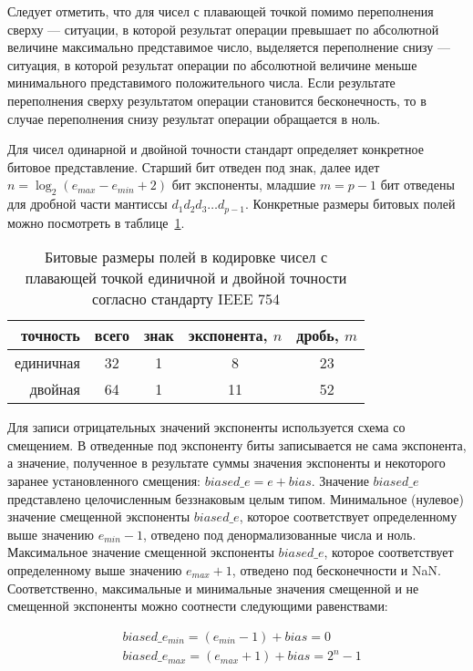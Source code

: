 Следует отметить, что для чисел с плавающей точкой помимо переполнения сверху --- ситуации, в которой результат операции превышает по абсолютной величине максимально представимое число, выделяется переполнение снизу --- ситуация, в которой результат операции по абсолютной величине меньше минимального представимого положительного числа.
Если результате переполнения сверху результатом операции становится бесконечность, то в случае переполнения снизу результат операции обращается в ноль.

Для чисел одинарной и двойной точности стандарт определяет конкретное битовое представление.
Старший бит отведен под знак, далее идет $n = \log_2(e_{max} - e_{min} + 2)$ бит экспоненты, младшие $m = p-1$ бит отведены для дробной части мантиссы $d_{1}d_{2}d_{3}\ldots d_{p-1}$.
Конкретные размеры битовых полей можно посмотреть в таблице~\ref{tab:ieee_bit_size_common}.

\begin{table}[h]
    \centering
    \begin{tabular}{r||c|c|c|c}
        точность  & всего & знак & экспонента, $n$ & дробь, $m$ \\
        \hline\hline
        единичная & 32    & 1    & 8               & 23    \\
        \hline
        двойная   & 64    & 1    & 11              & 52    \\
    \end{tabular}
    \caption{Битовые размеры полей в кодировке чисел с плавающей точкой единичной и двойной точности согласно стандарту IEEE 754}
    \label{tab:ieee_bit_size_common}
\end{table}

Для записи отрицательных значений экспоненты используется схема со смещением.
В отведенные под экспоненту биты записывается не сама экспонента, а значение, полученное в результате суммы значения экспоненты и некоторого заранее установленного смещения: $biased\_e = e + bias$.
Значение $biased\_e$ представлено целочисленным беззнаковым целым типом.
Минимальное (нулевое) значение смещенной экспоненты $biased\_e$, которое соответствует определенному выше значению $e_{min} - 1$, отведено под денормализованные числа и ноль.
Максимальное значение смещенной экспоненты $biased\_e$, которое соответствует определенному выше значению $e_{max} + 1$, отведено под бесконечности и NaN.
Соответственно, максимальные и минимальные значения смещенной и не смещенной экспоненты можно соотнести следующими равенствами:

\begin{align*}
    &biased\_e_{min} = (e_{min} - 1) + bias = 0 \\
    &biased\_e_{max} = (e_{max} + 1) + bias = 2^n - 1
\end{align*}

